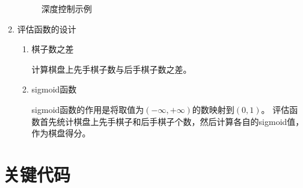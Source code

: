 \documentclass[10pt,letterpaper]{ctexart}
\begin{document}
\begin{enumerate}[itemindent=2.5em,label=\arabic*、]
\begin{figure}[H]
      \caption{深度控制示例}
    \end{figure}
    \item 评估函数的设计
      \begin{enumerate}[itemindent=2.5em,label=(\arabic*)]
        \item 棋子数之差
        \par \qquad 计算棋盘上先手棋子数与后手棋子数之差。
        \item sigmoid函数
        \par \qquad sigmoid函数的作用是将取值为$(-\infty, +\infty)$的数映射到$(0, 1)$。
        评估函数首先统计棋盘上先手棋子和后手棋子个数，然后计算各自的sigmoid值，作为棋盘得分。
      \end{enumerate}
\end{enumerate}

\section{关键代码}
\end{document}
